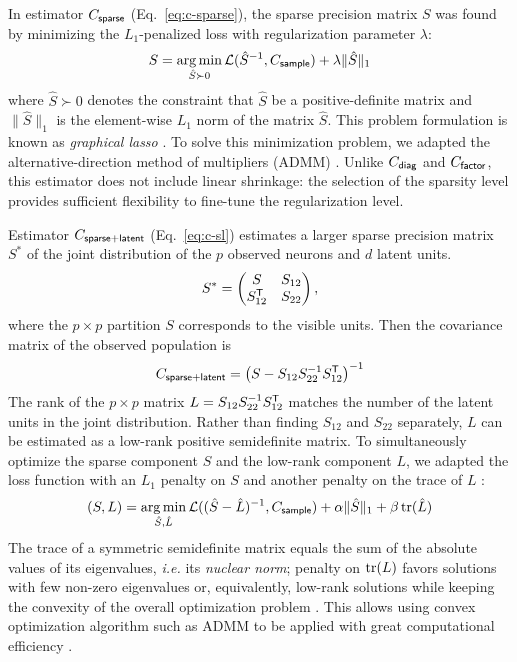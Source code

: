 In estimator $C_{\sf sparse}$ (Eq.~\ref{eq:c-sparse}), the sparse precision matrix $S$ was found by minimizing the $L_1$-penalized loss with regularization parameter $\lambda$:
\begin{equation}
S = \operatorname*{arg\,min}\limits_{\hat S \succ 0} \mathcal L({\hat S}^{-1},C_{\sf sample}) + \lambda \|\hat S \|_1
\end{equation}
where $\hat S\succ 0$ denotes the constraint that $\hat S$ be a positive-definite matrix and $\|\hat S\|_1$ is the element-wise $L_1$ norm of the matrix $\hat S$. This problem formulation is known as \emph{graphical lasso} \cite{Meinshausen:2006, Friedman:2008}. To solve this minimization problem, we adapted the alternative-direction method of multipliers (ADMM) \cite{Ma:2013}.
Unlike $C_{\sf diag}$ and $C_{\sf factor}$, this estimator does not include linear shrinkage: the selection of the sparsity level provides sufficient flexibility to fine-tune the regularization level.

Estimator $C_{\sf sparse+latent}$ (Eq.~\ref{eq:c-sl}) estimates a larger sparse precision matrix $S^\ast$ of the joint distribution of the $p$ observed neurons and $d$ latent units.
\begin{equation}
S^\ast=
\begin{pmatrix}
S & S_{12} \\
S_{12}^{\sf T} & S_{22}
\end{pmatrix},
\end{equation}
where the $p\times p$ partition $S$ corresponds to the visible units.
Then the covariance matrix of the observed population is
\begin{equation}
C_{\sf sparse+latent} = \left(S-S_{12}S_{22}^{-1}S_{12}^{\sf T}\right)^{-1}
\end{equation}
The rank of the $p\times p$  matrix $L=S_{12}S_{22}^{-1}S_{12}^{\sf T}$ matches the number of the latent units in the joint distribution. Rather than finding $S_{12}$ and $S_{22}$ separately, $L$ can be estimated as a low-rank positive semidefinite matrix. To simultaneously optimize the sparse component $S$ and the low-rank component $L$, we adapted the loss function with an $L_1$ penalty on $S$ and another penalty on the trace of $L$ \cite{Chandrasekaran:2010,Ma:2013}:
\begin{equation}\label{eq:ma}
	(S,L) = \operatorname*{arg\,min}\limits_{\hat S,\hat L} \mathcal L((\hat S-\hat L)^{-1}, C_{\sf sample}) + \alpha\|\hat S\|_1 + \beta\operatorname{tr}(\hat L)
\end{equation}
The trace of a symmetric semidefinite matrix equals the sum of the absolute values of its eigenvalues, \emph{i.e.} its \emph{nuclear norm}; penalty on $\operatorname{tr}(L)$ favors solutions with few non-zero eigenvalues or, equivalently, low-rank solutions while keeping the convexity of the overall optimization problem \cite{Fazel:2002,Recht:2010}. This allows using convex optimization algorithm such as ADMM to be applied with great computational efficiency \cite{Ma:2013}.


